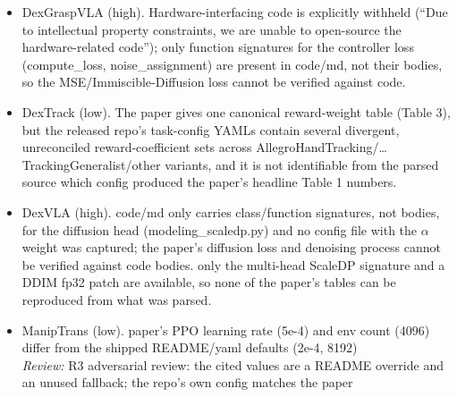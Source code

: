 \begin{itemize}
\item DexGraspVLA \cite{dexgraspvla_2025} (high). Hardware-interfacing code is explicitly withheld (``Due to intellectual property constraints, we are unable to open-source the hardware-related code''); only function signatures for the controller loss (compute\_\allowbreak{}loss, noise\_\allowbreak{}assignment) are present in code/md, not their bodies, so the MSE/Immiscible-Diffusion loss cannot be verified against code.
\item DexTrack \cite{dextrack_2025} (low). The paper gives one canonical reward-weight table (Table 3), but the released repo's task-config YAMLs contain several divergent, unreconciled reward-coefficient sets across AllegroHandTracking/\dots{}TrackingGeneralist/other variants, and it is not identifiable from the parsed source which config produced the paper's headline Table 1 numbers.
\item DexVLA \cite{dexvla_2025} (high). code/md only carries class/function signatures, not bodies, for the diffusion head (modeling\_\allowbreak{}scaledp.py) and no config file with the $\alpha$ weight was captured; the paper's diffusion loss and denoising process cannot be verified against code bodies. only the multi-head ScaleDP signature and a DDIM fp32 patch are available, so none of the paper's tables can be reproduced from what was parsed.
\item ManipTrans \cite{maniptrans_2025} (low). paper's PPO learning rate (5e-4) and env count (4096) differ from the shipped README/yaml defaults (2e-4, 8192)
  \\ \emph{Review:} R3 adversarial review: the cited values are a README override and an unused fallback; the repo's own config matches the paper
\end{itemize}
\endgroup



